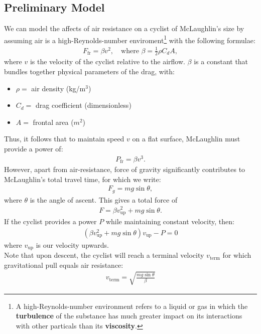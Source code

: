 \documentclass[twocolumn]{article}
\newcommand{\en}{\vspace{0.25cm}\\}
\begin{document}
\subsection{Preliminary Model}
We can model the affects of air resistance on a cyclist of McLaughlin's size by assuming air is a high-Reynolds-number enviroment\footnote{A high-Reynolds-number environment refers to a liquid or gas in which the \textbf{turbulence} of the substance has much greater impact on its interactions with other particals than its \textbf{viscosity}.} with the following formulae:
\begin{align}
    F_{\text{fr}}=\beta v^2, \quad \text{where } \beta = \frac{1}2\rho C_d A,
\end{align}
where $v$ is the velocity of the cyclist relative to the airflow. $\beta$ is a constant that bundles together physical parameters of the drag, with:
\begin{itemize}[parsep=0pt]
    \item $\rho = $ air density (kg/$\text{m}^3$)
    \item $C_d = $ drag coefficient (dimensionless)
    \item $A = $ frontal area ($m^2$)
\end{itemize}
Thus, it follows that to maintain speed $v$ on a flat surface, McLaughlin must provide a power of:
\begin{align}
    P_\text{fr}=\beta v^3.
\end{align}
However, apart from air-resistance, force of gravity significantly contributes to McLaughlin's total travel time, for which we write:
\begin{align*}
    F_g=mg\sin\theta,
\end{align*}
where $\theta$ is the angle of ascent. This gives a total force of
\begin{align}
    F = \beta v_\text{up}^2 + mg\sin\theta.
\end{align}
If the cyclist provides a power $P$ while maintaining constant velocity, then:\newcommand{\vup}{v_\text{up}}
\begin{align}
    (\beta \vup^2 + mg\sin\theta)\vup - P = 0
\end{align}
where $\vup$ is our velocity upwards.\en
Note that upon descent, the cyclist will reach a terminal velocity \newcommand{\vterm}{v_\text{term}}$\vterm$ for which gravitational pull equals air resistance:
\begin{align}
    \vterm = \sqrt{\frac{mg\sin\theta}{\beta}}
\end{align}
\end{document}
